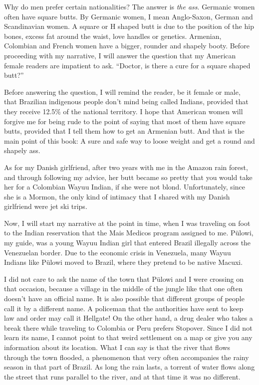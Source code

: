 \documentclass[
  12pt,
]{book}
\begin{document}
Why do men prefer certain nationalities? The answer is \emph{the ass}.
Germanic women often have square butts. By Germanic women, I mean
Anglo-Saxon, German and Scandinavian women. A square or H shaped butt is
due to the position of the hip bones, excess fat around the waist, love
handles or genetics. Armenian, Colombian and French women have a bigger,
rounder and shapely booty. Before proceeding with my narrative, I will
answer the question that my American female readers are impatient to
ask. ``Doctor, is there a cure for a square shaped butt?''

Before answering the question, I will remind the reader, be it female or
male, that Brazilian indigenous people don't mind being called Indians,
provided that they receive 12.5\% of the national territory. I hope that
American women will forgive me for being rude to the point of saying
that most of them have square butts, provided that I tell them how to
get an Armenian butt. And that is the main point of this book: A sure
and safe way to loose weight and get a round and shapely ass.

As for my Danish girlfriend, after two years with me in the Amazon rain
forest, and through following my advice, her butt became so pretty that
you would take her for a Colombian Wayuu Indian, if she were not blond.
Unfortunately, since she is a Mormon, the only kind of intimacy that I
shared with my Danish girlfriend were jet ski trips.

Now, I will start my narrative at the point in time, when I was
traveling on foot to the Indian reservation that the Mais Medicos
program assigned to me. Pülowi, my guide, was a young Wayuu Indian girl
that entered Brazil illegally across the Venezuelan border. Due to the
economic crisis in Venezuela, many Wayuu Indians like Pülowi moved to
Brazil, where they pretend to be native Macuxi.

I did not care to ask the name of the town that Pülowi and I were
crossing on that occasion, because a village in the middle of the jungle
like that one often doesn't have an official name. It is also possible
that different groups of people call it by a different name. A policeman
that the authorities have sent to keep law and order may call it
Hellgate! On the other hand, a drug dealer who takes a break there while
traveling to Colombia or Peru prefers Stopover. Since I did not learn
its name, I cannot point to that weird settlement on a map or give you
any information about its location. What I can say is that the river
that flows through the town flooded, a phenomenon that very often
accompanies the rainy season in that part of Brazil. As long the rain
lasts, a torrent of water flows along the street that runs parallel to
the river, and at that time it was no different.
\end{document}
